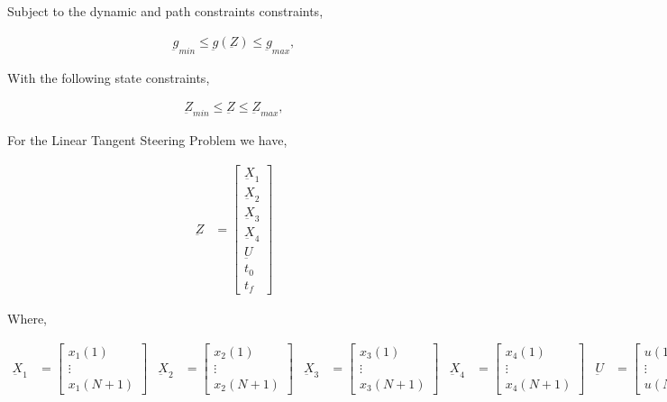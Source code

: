 \documentclass[11pt,usenames]{article}
\begin{document}
	Subject to the dynamic and path constraints constraints,
	
	\begin{align}
	\underbar g_{min} \leq \underbar g(\underbar Z) \leq \underbar g_{max},
	\end{align}
	
	With the following state constraints,
	
	\begin{align}
	\underbar Z_{min} \leq \underbar  Z \leq \underbar Z_{max},
	\end{align}
	
	For the Linear Tangent Steering Problem we have,
	
	\begin{align}
	\underbar Z &= 
	\begin{bmatrix}
	\underbar X_{1} \\ \underbar X_{2} \\ \underbar X_{3} \\ \underbar X_{4} \\ \underbar U \\ t_{0} \\ t_{f}
	\end{bmatrix}
	\end{align}
	
	Where,
	
	\begin{align}
	\underbar X_{1} &=
	\begin{bmatrix}
	x_{1}(1) \\ \vdots \\  x_{1}(N+1) 
	\end{bmatrix}
	& \underbar X_{2} &=
	\begin{bmatrix}
	x_{2}(1) \\  \vdots \\  x_{2}(N+1) 
	\end{bmatrix}
	& \underbar X_{3} &= 
	\begin{bmatrix}
	x_{3}(1) \\  \vdots \\  x_{3}(N+1) 
	\end{bmatrix}
	& \underbar X_{4} &= 
	\begin{bmatrix}
	x_{4}(1) \\  \vdots \\  x_{4}(N+1) 
	\end{bmatrix}
	& \underbar U &= 
	\begin{bmatrix}
	u(1) \\  \vdots \\  u(N) 
	\end{bmatrix} 
	\end{align}
	
\end{document}
